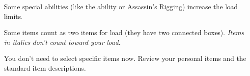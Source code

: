 Some special abilities (like the  ability or Assassin’s Rigging) increase the load limits.

Some items count as two items for load (they have two connected boxes). \textit{Items in italics don’t count toward your load.}

You don’t need to select specific items now. Review your personal items and the standard item descriptions.

